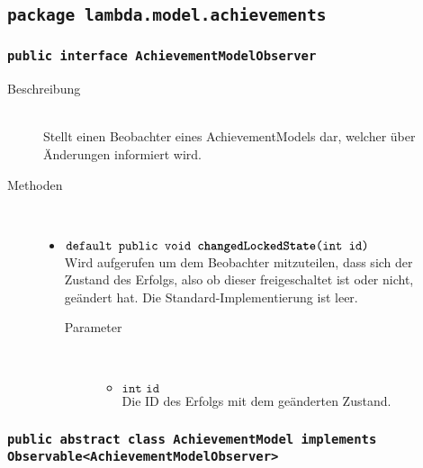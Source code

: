 \subsection{\texttt{package lambda.model.achievements}}

\subsubsection{\normalfont \texttt{public interface \textbf{AchievementModelObserver}}}

\begin{description}
\item[Beschreibung] \hfill \\ Stellt einen Beobachter eines AchievementModels dar, welcher über Änderungen informiert wird.

\item[Methoden] \hfill \\
	\vspace{-.8cm}
	\begin{itemize}
		\item $\texttt{default public void \textbf{changedLockedState}(int id)}$ \\ Wird aufgerufen um dem Beobachter mitzuteilen, dass sich der Zustand des Erfolgs, also ob dieser freigeschaltet ist oder nicht, geändert hat. Die Standard-Implementierung ist leer.
			\begin{description}
			\item[Parameter] \hfill \\
			\vspace{-.8cm}
			\begin{itemize}
				\item $\texttt{int id}$ \\ Die ID des Erfolgs mit dem geänderten Zustand.
			\end{itemize}
			\end{description}
	\end{itemize}
\end{description}

\subsubsection{\normalfont \texttt{public abstract class \textbf{AchievementModel} implements Observable<AchievementModelObserver>}}

